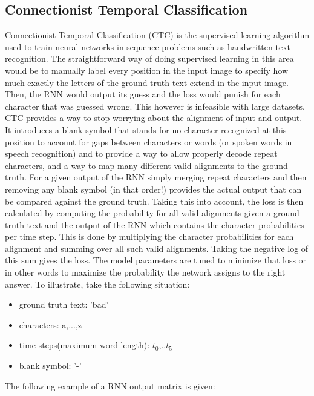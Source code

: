 \documentclass{article}
\begin{document}
\subsection{Connectionist Temporal Classification}
Connectionist Temporal Classification (CTC) is the supervised learning algorithm used to train neural networks in sequence problems such as handwritten text recognition. The straightforward way of doing supervised learning in this area would be to manually label every position in the input image to specify how much exactly the letters of the ground truth text extend in the input image. Then, the RNN would output its guess and the loss would punish for each character that was guessed wrong. This however is infeasible with large datasets. CTC provides a way to stop worrying about the alignment of input and output. It introduces a blank symbol that stands for no character recognized at this position to account for gaps between characters or words (or spoken words in speech recognition) and to provide a way to allow properly decode repeat characters, and a way to map many different valid alignments to the ground truth.
For a given output of the RNN simply merging repeat characters and then removing any blank symbol (in that order!) provides the actual output that can be compared against the ground truth. Taking this into account, the loss is then calculated by computing the probability for all valid alignments given a ground truth text and the output of the RNN which contains the character probabilities per time step. This is done by multiplying the character probabilities for each alignment and summing over all such valid alignments. Taking the negative log of this sum gives the loss. The model parameters are tuned to minimize that loss or in other words to maximize the probability the network assigns to the right answer. To illustrate, take the following situation:
\begin{itemize}
\item ground truth text: 'bad'
\item characters: a,...,z
\item time steps(maximum word length): \(t_0\),..\(t_5\)
\item blank symbol: '-'
\end{itemize}
The following example of a RNN output matrix is given:
\end{document}
